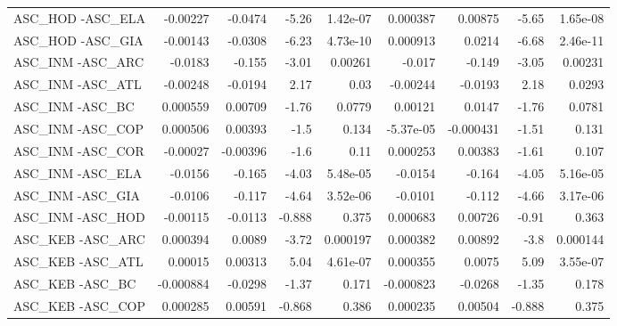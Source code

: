 \begin{tabular}{lrrrrrrrr}
ASC\_HOD -ASC\_ELA                       &    -0.00227 &      -0.0474 &   -5.26 & 1.42e-07 &   0.000387 &     0.00875 &        -5.65 &      1.65e-08 \\
ASC\_HOD -ASC\_GIA                       &    -0.00143 &      -0.0308 &   -6.23 & 4.73e-10 &   0.000913 &      0.0214 &        -6.68 &      2.46e-11 \\
ASC\_INM -ASC\_ARC                       &     -0.0183 &       -0.155 &   -3.01 &  0.00261 &     -0.017 &      -0.149 &        -3.05 &       0.00231 \\
ASC\_INM -ASC\_ATL                       &    -0.00248 &      -0.0194 &    2.17 &     0.03 &   -0.00244 &     -0.0193 &         2.18 &        0.0293 \\
ASC\_INM -ASC\_BC                        &    0.000559 &      0.00709 &   -1.76 &   0.0779 &    0.00121 &      0.0147 &        -1.76 &        0.0781 \\
ASC\_INM -ASC\_COP                       &    0.000506 &      0.00393 &    -1.5 &    0.134 &  -5.37e-05 &   -0.000431 &        -1.51 &         0.131 \\
ASC\_INM -ASC\_COR                       &    -0.00027 &     -0.00396 &    -1.6 &     0.11 &   0.000253 &     0.00383 &        -1.61 &         0.107 \\
ASC\_INM -ASC\_ELA                       &     -0.0156 &       -0.165 &   -4.03 & 5.48e-05 &    -0.0154 &      -0.164 &        -4.05 &      5.16e-05 \\
ASC\_INM -ASC\_GIA                       &     -0.0106 &       -0.117 &   -4.64 & 3.52e-06 &    -0.0101 &      -0.112 &        -4.66 &      3.17e-06 \\
ASC\_INM -ASC\_HOD                       &    -0.00115 &      -0.0113 &  -0.888 &    0.375 &   0.000683 &     0.00726 &        -0.91 &         0.363 \\
ASC\_KEB -ASC\_ARC                       &    0.000394 &       0.0089 &   -3.72 & 0.000197 &   0.000382 &     0.00892 &         -3.8 &      0.000144 \\
ASC\_KEB -ASC\_ATL                       &     0.00015 &      0.00313 &    5.04 & 4.61e-07 &   0.000355 &      0.0075 &         5.09 &      3.55e-07 \\
ASC\_KEB -ASC\_BC                        &   -0.000884 &      -0.0298 &   -1.37 &    0.171 &  -0.000823 &     -0.0268 &        -1.35 &         0.178 \\
ASC\_KEB -ASC\_COP                       &    0.000285 &      0.00591 &  -0.868 &    0.386 &   0.000235 &     0.00504 &       -0.888 &         0.375 \\

\end{tabular}
